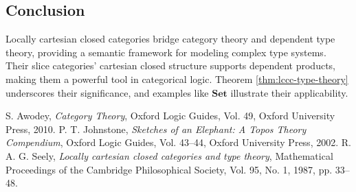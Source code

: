 \documentclass{article}
\theoremstyle{plain}
\theoremstyle{remark}
\begin{document}
\subsection{Conclusion}

Locally cartesian closed categories bridge category theory and dependent type theory, providing a semantic framework for modeling complex type systems. Their slice categories’ cartesian closed structure supports dependent products, making them a powerful tool in categorical logic. Theorem \ref{thm:lccc-type-theory} underscores their significance, and examples like $\mathbf{Set}$ illustrate their applicability.

\begin{thebibliography}{9}

 S. Awodey, \emph{Category Theory}, Oxford Logic Guides, Vol. 49, Oxford University Press, 2010.
 P. T. Johnstone, \emph{Sketches of an Elephant: A Topos Theory Compendium}, Oxford Logic Guides, Vol. 43–44, Oxford University Press, 2002.
 R. A. G. Seely, \emph{Locally cartesian closed categories and type theory}, Mathematical Proceedings of the Cambridge Philosophical Society, Vol. 95, No. 1, 1987, pp. 33--48.

\end{thebibliography}
\end{document}
